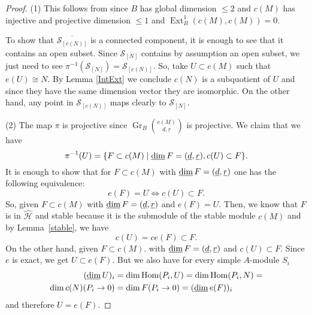 \documentclass[11pt,a4paper]{amsart}
\theoremstyle{plain}
\theoremstyle{definition}
\begin{document}
\begin{proof} 
(1)  This follows from  \cite[Proposition 7.1]{CIFR} since $B$ has global
dimension $\le 2$ and $c(M)$ has injective and projective dimension $\le 1$ and
$\operatorname{Ext}^1_B(c(M),c(M))=0$.

To show that $\overline{\mathcal{S}_{[{c} (N)]}}$ is a connected component, it is enough to see that 
it contains an open subset. Since ${\mathcal{S}_{[N]}}$ contains by assumption an open subset, we just need to see $\pi^{-1}({\mathcal{S}_{[N]}})={\mathcal{S}_{[{c} (N)]}}$. So, take $U\subset {c} (M)$ such that $e(U)\cong N$. By Lemma \ref{IntExt} we conclude ${c} (N)$ is a subquotient of $U$ and since they have the same dimension vector they are isomorphic. On the other hand, any point in ${\mathcal{S}_{[{c} (N)]}}$ maps clearly to ${\mathcal{S}_{[N]}}$.   

(2) 
The map $\pi$ is projective since ${\operatorname{Gr}_B \binom{{c} (M)}{\underline{d}, \underline{r}}}$ is projective. 
We claim that we have  
\[
\pi^{-1}(U)= \{ F\subset {c} (M) \mid \operatorname{\rm \underline{dim}} F ={(\underline{d}, \underline{r})}, {c} (U) \subset F \}. 
\]
It is enough to show that for $F\subset {c} (M)$ with $\operatorname{\rm \underline{dim}} F ={(\underline{d}, \underline{r})} $ one has the following equivalence: 
\[ 
{e} (F) =U \Leftrightarrow {c} (U) \subset F.
\]
So, given $F\subset {c} (M)$ with $\operatorname{\rm \underline{dim}} F ={(\underline{d}, \underline{r})}$ and ${e} (F) =U$. 
Then, we know that $F$ is in ${\widehat{\mathcal{H}}  }$ and stable because it is the submodule of the stable module ${c} (M)$ and by Lemma~\ref{stable}, we have 
\[ 
{c} (U) ={c} {e} (F) \subset F. 
\]
On the other hand, given $F\subset {c} (M)$.  
with $\operatorname{\rm \underline{dim}} F ={(\underline{d}, \underline{r})}$ and ${c} (U) \subset F$. Since ${e} $ is exact, we get $U\subset {e} (F)$. But we also have for every simple $A$-module $S_i$ 
\[ 
\begin{aligned}
(\operatorname{\rm \underline{dim}} U)_i & = \dim \operatorname{Hom} (P_i, U) =\dim \operatorname{Hom} (P_i, N) = \\
\dim {c} (N)(P_i\to 0) &=\dim F(P_i\to 0) = (\operatorname{\rm \underline{dim}} {e} (F))_i 
\end{aligned}
\] 
and therefore $U={e} (F)$.
 

\end{proof}
\end{document}
